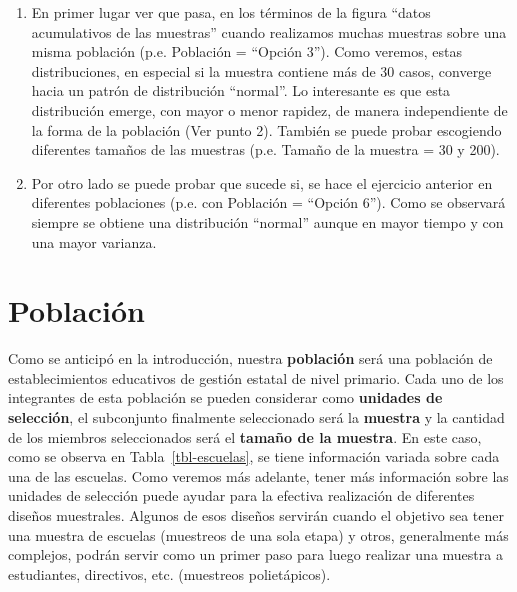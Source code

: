 \documentclass[
  spanish,
  a4paper,
]{scrreprt}
\begin{document}
\begin{enumerate}
\def\labelenumi{\arabic{enumi}.}
\item
  En primer lugar ver que pasa, en los términos de la figura ``datos
  acumulativos de las muestras'' cuando realizamos muchas muestras sobre
  una misma población (p.e. Población = ``Opción 3''). Como veremos,
  estas distribuciones, en especial si la muestra contiene más de 30
  casos, converge hacia un patrón de distribución ``normal''. Lo
  interesante es que esta distribución emerge, con mayor o menor
  rapidez, de manera independiente de la forma de la población (Ver
  punto 2). También se puede probar escogiendo diferentes tamaños de las
  muestras (p.e. Tamaño de la muestra = 30 y 200).
\item
  Por otro lado se puede probar que sucede si, se hace el ejercicio
  anterior en diferentes poblaciones (p.e. con Población = ``Opción
  6''). Como se observará siempre se obtiene una distribución ``normal''
  aunque en mayor tiempo y con una mayor varianza.
\end{enumerate}

\section{Población}\label{poblaciuxf3n}

Como se anticipó en la introducción, nuestra \textbf{población} será una
población de establecimientos educativos de gestión estatal de nivel
primario. Cada uno de los integrantes de esta población se pueden
considerar como \textbf{unidades de selección}, el subconjunto
finalmente seleccionado será la \textbf{muestra} y la cantidad de los
miembros seleccionados será el \textbf{tamaño de la muestra}. En este
caso, como se observa en Tabla~\ref{tbl-escuelas}, se tiene información
variada sobre cada una de las escuelas. Como veremos más adelante, tener
más información sobre las unidades de selección puede ayudar para la
efectiva realización de diferentes diseños muestrales. Algunos de esos
diseños servirán cuando el objetivo sea tener una muestra de escuelas
(muestreos de una sola etapa) y otros, generalmente más complejos,
podrán servir como un primer paso para luego realizar una muestra a
estudiantes, directivos, etc. (muestreos polietápicos).
\end{document}
